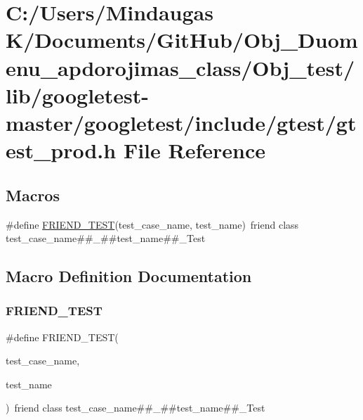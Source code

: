 \hypertarget{_obj__test_2lib_2googletest-master_2googletest_2include_2gtest_2gtest__prod_8h}{}\section{C\+:/\+Users/\+Mindaugas K/\+Documents/\+Git\+Hub/\+Obj\+\_\+\+Duomenu\+\_\+apdorojimas\+\_\+class/\+Obj\+\_\+test/lib/googletest-\/master/googletest/include/gtest/gtest\+\_\+prod.h File Reference}
\label{_obj__test_2lib_2googletest-master_2googletest_2include_2gtest_2gtest__prod_8h}
\subsection*{Macros}
\begin{DoxyCompactItemize}
\item 
\#define \mbox{\hyperlink{_obj__test_2lib_2googletest-master_2googletest_2include_2gtest_2gtest__prod_8h_a8d443b4cc1d87a7a17943b8fbdbf3910}{F\+R\+I\+E\+N\+D\+\_\+\+T\+E\+ST}}(test\+\_\+case\+\_\+name,  test\+\_\+name)~friend class test\+\_\+case\+\_\+name\#\#\+\_\+\#\#test\+\_\+name\#\#\+\_\+\+Test
\end{DoxyCompactItemize}


\subsection{Macro Definition Documentation}
\mbox{\label{_obj__test_2lib_2googletest-master_2googletest_2include_2gtest_2gtest__prod_8h_a8d443b4cc1d87a7a17943b8fbdbf3910}} 
\subsubsection{\texorpdfstring{FRIEND\_TEST}{FRIEND\_TEST}}
{\footnotesize\ttfamily \#define F\+R\+I\+E\+N\+D\+\_\+\+T\+E\+ST(\begin{DoxyParamCaption}\item[{}]{test\+\_\+case\+\_\+name,  }\item[{}]{test\+\_\+name }\end{DoxyParamCaption})~friend class test\+\_\+case\+\_\+name\#\#\+\_\+\#\#test\+\_\+name\#\#\+\_\+\+Test}

